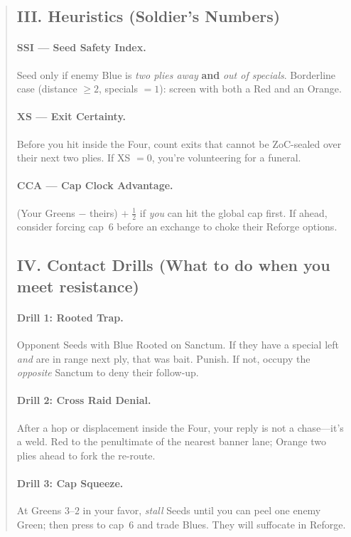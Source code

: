 \documentclass[11pt]{article}
\begin{document}
\begin{quote}
\subsection{III. Heuristics (Soldier’s Numbers)}
\paragraph{SSI — Seed Safety Index.} Seed only if enemy Blue is \emph{two plies away} \textbf{and} \emph{out of specials}. Borderline case (distance $\ge 2$, specials $=1$): screen with both a Red and an Orange.
\paragraph{XS — Exit Certainty.} Before you hit inside the Four, count exits that cannot be ZoC-sealed over their next two plies. If XS $=0$, you’re volunteering for a funeral.
\paragraph{CCA — Cap Clock Advantage.} (Your Greens $-$ theirs) $+\;\tfrac{1}{2}$ if \emph{you} can hit the global cap first. If ahead, consider forcing cap~6 before an exchange to choke their Reforge options.

\subsection{IV. Contact Drills (What to do when you meet resistance)}
\paragraph{Drill 1: Rooted Trap.} Opponent Seeds with Blue Rooted on Sanctum. If they have a special left \emph{and} are in range next ply, that was bait. Punish. If not, occupy the \emph{opposite} Sanctum to deny their follow-up.
\paragraph{Drill 2: Cross Raid Denial.} After a hop or displacement inside the Four, your reply is not a chase—it's a weld. Red to the penultimate of the nearest banner lane; Orange two plies ahead to fork the re-route.
\paragraph{Drill 3: Cap Squeeze.} At Greens $3$–$2$ in your favor, \emph{stall} Seeds until you can peel one enemy Green; then press to cap~6 and trade Blues. They will suffocate in Reforge.


\end{quote}
\end{document}
